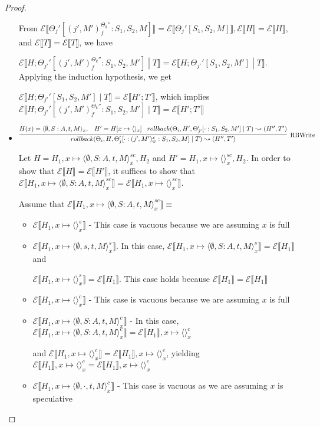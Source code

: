 \documentclass[9pt]{article}
\newcommand{\erase}[1]{\mathcal{E}\llbracket #1 \rrbracket}
\begin{document}
\begin{proof}
\begin{itemize}
From $\erase{\Theta_j'[(j', M')_f^{\Theta_k''} : S_1, S_2, M]} = \erase{\Theta_j'[S_1, S_2, M]}, \erase{H} = \erase{H}$, and $\erase{T} = \erase{T}$, we have 

$\erase{H; \Theta_{j'}'[(j', M')_f^{\Theta_k''} : S_1, S_2, M'] \; | \; T} = \erase{H; \Theta_{j'}'[S_1, S_2, M'] \; | \; T}$.  Applying the induction hypothesis, we get

$\erase{H; \Theta_{j'}'[S_1, S_2, M'] \; | \; T} = \erase{H'; T'}$, which implies $\erase{H; \Theta_{j'}'[(j', M')_f^{\Theta_k''} : S_1, S_2, M'] \; | \; T} = \erase{H'; T'}$

\item $\infer[\text{RBWrite}]{rollback(\Theta_i, H, \Theta_j'[\cdot : (j', M')_w^x : S_1, S_2, M] \; | \; T) \leadsto (H'', T')}{H(x) = \langle \emptyset, S:A, t, M\rangle_x, \;\;\; H' = H[x \mapsto \langle\rangle_x] \;\;\; rollback(\Theta_i, H', \Theta_{j'}'[\cdot : S_1, S_2, M'] \; | \; T) \leadsto (H'', T')}$

Let $H = H_1, x\mapsto \langle \emptyset, S:A, t, M\rangle_x^{sc}, H_2$ and $H' = H_1, x \mapsto \langle \rangle_x^{sc}, H_2$.  In order to show that $\erase{H} = \erase{H'}$, it suffices to show that $\erase{H_1, x \mapsto \langle \emptyset, S:A, t, M\rangle_x^{sc}} = \erase{H_1, x \mapsto \langle\rangle_x^{sc}}$.  

Assume that $\erase{H_1, x \mapsto \langle \emptyset, S:A, t, M\rangle_x^{sc}} \equiv $

\begin{itemize}
\item  $\erase{H_1, x \mapsto \langle\rangle_x^s} $ - This case is vacuous because we are assuming $x$ is full
\item  $\erase{H_1, x \mapsto \langle \emptyset, s, t, M\rangle_x^s}$.  In this case, $\erase{H_1, x \mapsto \langle\emptyset, S:A, t, M\rangle_x^s} = \erase{H_1}$ and 

	$\erase{H_1, x \mapsto \langle \rangle_x^s} = \erase{H_1}$.  This case holds because $\erase{H_1} = \erase{H_1}$
\item  $\erase{H_1, x \mapsto \langle\rangle_x^c} $ - This case is vacuous because we are assuming $x$ is full
\item  $\erase{H_1, x\mapsto \langle\emptyset, S : A, t, M\rangle_x^c} $ - In this case, $\erase{H_1, x \mapsto \langle \emptyset, S : A, t, M\rangle_x^c} = \erase{H_1}, x \mapsto \langle\rangle_x^c$ 

and $\erase{H_1, x \mapsto \langle \rangle_x^c} = \erase{H_1}, x\mapsto \langle\rangle_x^c$, yielding  $\erase{H_1}, x\mapsto \langle\rangle_x^c = \erase{H_1}, x\mapsto \langle\rangle_x^c$
\item  $\erase{H_1, x \mapsto \langle\emptyset, \cdot, t, M\rangle_x^c} $ - This case is vacuous as we are assuming $x$ is speculative
\end{itemize}


\end{itemize}
\end{proof}
\end{document}
